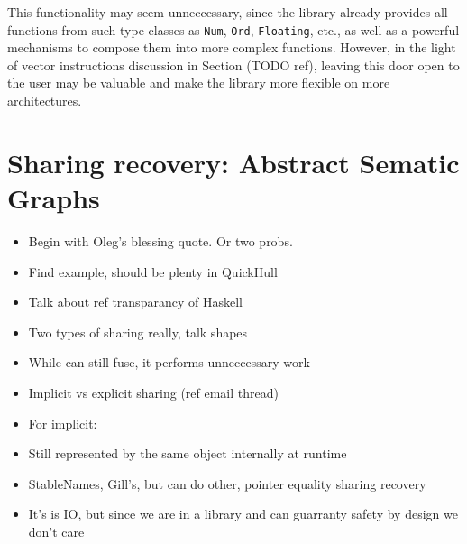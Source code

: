 \documentclass[preamble.tex]{subfiles}
\begin{document}
This functionality may seem unneccessary, since the library already provides all functions from such type classes as \texttt{Num}, \texttt{Ord}, \texttt{Floating}, etc., as well as a powerful mechanisms to compose them into more complex functions. However, in the light of vector instructions discussion in Section (TODO ref), leaving this door open to the user may be valuable and make the library more flexible on more architectures.



\pagebreak
\section{Sharing recovery: Abstract Sematic Graphs}

\begin{itemize}
\item Begin with Oleg's blessing quote. Or two probs.
\item Find example, should be plenty in QuickHull
\item Talk about ref transparancy of Haskell
\item Two types of sharing really, talk shapes
\item While can still fuse, it performs unneccessary work
\item Implicit vs explicit sharing (ref email thread)
\item For implicit:
\item Still represented by the same object internally at runtime
\item StableNames, Gill's, but can do other, pointer equality sharing recovery
\item It's is IO, but since we are in a library and can guarranty safety by design we don't care
\end{itemize}
\end{document}
